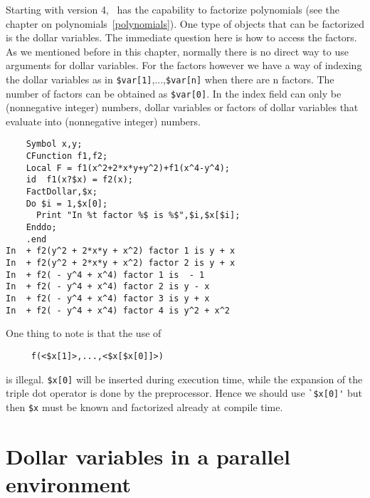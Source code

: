 Starting with version 4, \FORM\ has the capability to factorize polynomials 
(see the chapter on polynomials~\ref{polynomials}). One type of objects 
that can be factorized is the dollar variables. The immediate question here 
is how to access the factors. As we mentioned before in this chapter, 
normally there is no direct way to use arguments for dollar variables. For 
the factors however we have a way of indexing the dollar variables as in 
\verb:$var[1]:,...,\verb:$var[n]: when there are n factors. The number of 
factors can be obtained as \verb:$var[0]:. In the index field can only be 
(nonnegative integer) numbers, dollar variables or factors of dollar 
variables that evaluate into (nonnegative integer) numbers.
\begin{verbatim}
    Symbol x,y;
    CFunction f1,f2;
    Local F = f1(x^2+2*x*y+y^2)+f1(x^4-y^4);
    id  f1(x?$x) = f2(x);
    FactDollar,$x;
    Do $i = 1,$x[0];
      Print "In %t factor %$ is %$",$i,$x[$i];
    Enddo;
    .end
In  + f2(y^2 + 2*x*y + x^2) factor 1 is y + x
In  + f2(y^2 + 2*x*y + x^2) factor 2 is y + x
In  + f2( - y^4 + x^4) factor 1 is  - 1
In  + f2( - y^4 + x^4) factor 2 is y - x
In  + f2( - y^4 + x^4) factor 3 is y + x
In  + f2( - y^4 + x^4) factor 4 is y^2 + x^2
\end{verbatim}

One thing to note is that the use of
\begin{verbatim}
     f(<$x[1]>,...,<$x[$x[0]]>)
\end{verbatim}
is illegal. \verb:$x[0]: will be inserted during execution time, while the 
expansion of the triple dot operator is done by the preprocessor. Hence we 
should use \verb:`$x[0]': but then \verb:$x: must be known and factorized 
already at compile time.
 
\section{Dollar variables in a parallel environment}
\label{pardollars}

